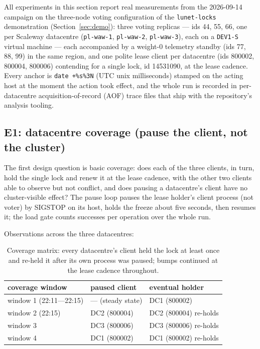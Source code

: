 \documentclass[10pt,journal,letterpaper]{IEEEtran}
\newcommand{\code}[1]{\texttt{\small #1}}
\begin{document}
All experiments in this section report real measurements from the
2026-09-14 campaign on the three-node voting configuration of the
\code{lunet-locks} demonstration (Section~\ref{sec:demo}): three voting
replicas --- ids 44, 55, 66, one per Scaleway datacentre
(\code{pl-waw-1}, \code{pl-waw-2}, \code{pl-waw-3}), each on a
\code{DEV1-S} virtual machine --- each accompanied by a weight-0
telemetry standby (ids 77, 88, 99) in the same region, and one polite
lease client per datacentre (ids 800002, 800004, 800006) contending for
a single lock, id 14531090, at the lease cadence. Every anchor is
\code{date +\%s\%3N} (UTC unix milliseconds) stamped on the acting
host at the moment the action took effect, and the whole run is
recorded in per-datacentre acquisition-of-record (AOF) trace files that
ship with the repository's analysis tooling.

\subsection{E1: datacentre coverage (pause the client, not the cluster)}

The first design question is basic coverage: does each of the three
clients, in turn, hold the single lock and renew it at the lease
cadence, with the other two clients able to observe but not conflict,
and does pausing a datacentre's client have no cluster-visible effect?
The pause loop pauses the lease holder's client process (not voter) by
SIGSTOP on its host, holds the freeze about five seconds, then resumes
it; the load gate counts successes per operation over the whole run.

Observations across the three datacentres:

\begin{table}[t]
\centering
\small
\begin{tabular}{lll}
\toprule
coverage window & paused client & eventual holder \\
\midrule
window 1 (22:11---22:15) & --- (steady state) & DC1 (800002) \\
window 2 (22:15) & DC2 (800004) & DC2 (800004) re-holds \\
window 3 & DC3 (800006) & DC3 (800006) re-holds \\
window 4 & DC1 (800002) & DC1 (800002) re-holds \\
\bottomrule
\end{tabular}
\caption{Coverage matrix: every datacentre's client held the lock at
least once and re-held it after its own process was paused; bumps
continued at the lease cadence throughout.}
\label{tab:coverage}
\end{table}
\end{document}
